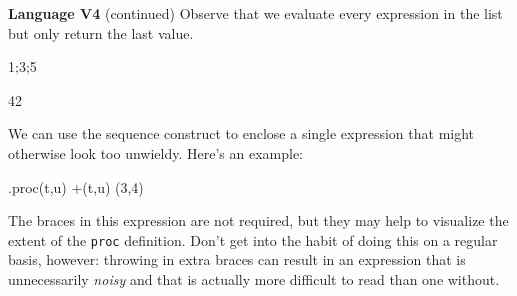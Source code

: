 \begin{minipage}[t]{\sw}
\slidenumber
\LARGE
{\bf Language V4} (continued)\exx
Observe that we evaluate every expression in the list
but only return the last value.
\begin{qv}
{1;3;5}

{42}
\end{qv}
We can use the sequence construct to enclose a single expression
that might otherwise look too unwieldy.
Here's an example:
\begin{qv}
.{proc(t,u) +(t,u)} (3,4)
\end{qv}
The braces in this expression are not required,
but they may help to visualize the extent
of the \verb'proc' definition.
Don't get into the habit
of doing this on a regular basis, however:
throwing in extra braces can result
in an expression that is unnecessarily {\em noisy}
and that is actually more difficult to read
than one without.
\end{minipage}
\clearpage
